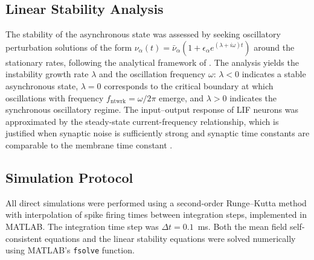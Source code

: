 \documentclass[10pt]{article}
\begin{document}
\subsection{Linear Stability Analysis}

The stability of the asynchronous state was assessed by seeking oscillatory perturbation solutions of the form $\nu_\alpha(t) = \bar{\nu}_\alpha(1 + \epsilon_\alpha e^{(\lambda + i\omega)t})$ around the stationary rates, following the analytical framework of \citet{brunel2003fast}. The analysis yields the instability growth rate $\lambda$ and the oscillation frequency $\omega$: $\lambda < 0$ indicates a stable asynchronous state, $\lambda = 0$ corresponds to the critical boundary at which oscillations with frequency $f_{\mathrm{ntwrk}} = \omega / 2\pi$ emerge, and $\lambda > 0$ indicates the synchronous oscillatory regime. The input--output response of LIF neurons was approximated by the steady-state current-frequency relationship, which is justified when synaptic noise is sufficiently strong and synaptic time constants are comparable to the membrane time constant \citep{brunel1999fast}.

\subsection{Simulation Protocol}

All direct simulations were performed using a second-order Runge--Kutta method with interpolation of spike firing times between integration steps, implemented in MATLAB. The integration time step was $\Delta t = 0.1$~ms. Both the mean field self-consistent equations and the linear stability equations were solved numerically using MATLAB's \texttt{fsolve} function.


\end{document}
